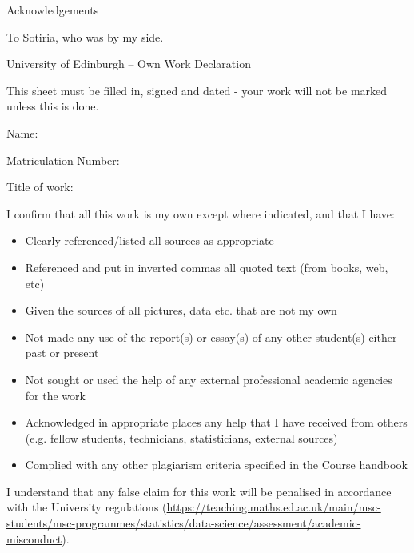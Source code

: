 \documentclass[11pt,twoside]{article}
\numberwithin{Theorem}{section}
\numberwithin{Definition}{section}
\numberwithin{Lemma}{section}
\numberwithin{Algorithm}{section}
\numberwithin{equation}{section}
\newcommand{\dottedline}[1]{\makebox[#1]{.\dotfill}}
\begin{document}
\clearpage

\begin{center}
\Large{Acknowledgements}
\end{center}

To Sotiria, who was by my side.

\clearpage

\begin{center}
\Large{University of Edinburgh – Own Work Declaration}
\end{center}


This sheet must be filled in, signed and dated - your work will not be marked unless this is done.
\vspace{1cm}

Name: \dottedline{8cm}

Matriculation Number: \dottedline{6cm}

Title of work: \dottedline{8cm}

\vspace{1cm}

I confirm that all this work is my own except where indicated, and that I have:
\begin{itemize}
\item	Clearly referenced/listed all sources as appropriate	 				
\item	Referenced and put in inverted commas all quoted text (from books, web, etc)	
\item	Given the sources of all pictures, data etc. that are not my own				
\item	Not made any use of the report(s) or essay(s) of any other student(s) either past 	
or present	
\item	Not sought or used the help of any external professional academic agencies for the work
\item	Acknowledged in appropriate places any help that I have received from others	(e.g. fellow students, technicians, statisticians, external sources)
\item	Complied with any other plagiarism criteria specified in the Course handbook
\end{itemize}

I understand that any false claim for this work will be penalised in accordance with
the University regulations	(\url{https://teaching.maths.ed.ac.uk/main/msc-students/msc-programmes/statistics/data-science/assessment/academic-misconduct}).								

\vspace{1cm}
\end{document}
